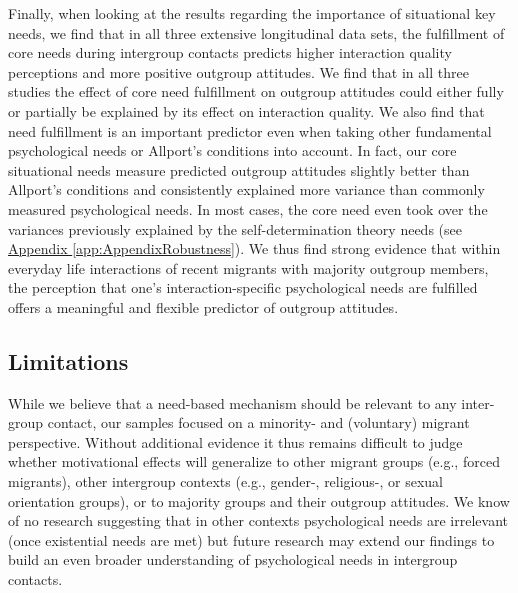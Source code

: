 \documentclass[man, 12pt, a4paper, mask]{apa7}
\theoremstyle{break}
\theoremstyle{plain}
\newcommand{\appref}[2][]{\hyperref[#2]{Appendix \ref*{#2}#1}}
\begin{document}
Finally, when looking at the results regarding the importance of situational key needs, we find that in all three extensive longitudinal data sets, the fulfillment of core needs during intergroup contacts predicts higher interaction quality perceptions and more positive outgroup attitudes. We find that in all three studies the effect of core need fulfillment on outgroup attitudes could either fully or partially be explained by its effect on interaction quality. We also find that need fulfillment is an important predictor even when taking other fundamental psychological needs or Allport's conditions into account. In fact, our core situational needs measure predicted outgroup attitudes slightly better than Allport's conditions and consistently explained more variance than commonly measured psychological needs. In most cases, the core need even took over the variances previously explained by the self-determination theory needs (see \appref{app:AppendixRobustness}). We thus find strong evidence that within everyday life interactions of recent migrants with majority outgroup members, the perception that one's interaction-specific psychological needs are fulfilled offers a meaningful and flexible predictor of outgroup attitudes.

\subsection{Limitations}
While we believe that a need-based mechanism should be relevant to any inter-group contact, our samples focused on a minority- and (voluntary) migrant perspective. Without additional evidence it thus remains difficult to judge whether motivational effects will generalize to other migrant groups (e.g., forced migrants), other intergroup contexts (e.g., gender-, religious-, or sexual orientation groups), or to majority groups and their outgroup attitudes. We know of no research suggesting that in other contexts psychological needs are irrelevant (once existential needs are met) but future research may extend our findings to build an even broader understanding of psychological needs in intergroup contacts. 
\end{document}

